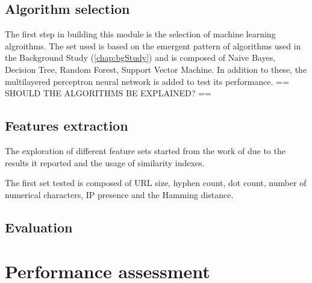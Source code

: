 \subsection{Algorithm selection}
The first step in building this module is the selection of machine learning algroithms. The set used is based on the emergent pattern of algorithms used in the Background Study (\ref{chap:bgStudy}) and is composed of Naive Bayes, Decision Tree, Random Forest, Support Vector Machine. In addition to these, the multilayered perceptron neural network is added to test its performance.
== SHOULD THE ALGORITHMS BE EXPLAINED? ==

\subsection{Features extraction}

The exploration of different feature sets started from the work of \cite{SVM_SIMILARITY_INDEX} due to the results it reported and the usage of similarity indexes.

The first set tested is composed of URL size, hyphen count, dot count, number of numerical characters, IP presence and the Hamming distance. 

\subsection{Evaluation}

\section{Performance assessment}

\iffalse
You should always start with an overview (Heading 2 style) to tell what this chapter is about and finish with a summary (Heading 2 style) to tell what has been covered in this chapter.

The Design and Implementation chapter should explain the design technique chosen and justify why it is appropriate, depending on the development methodology.  Suitable diagram-techniques (e.g. UML, other drawings) should be used where appropriate. For the Implementation part, it should talk about the technical realisation of the concepts and ideas developed earlier. It is used to describe the system at a finer level of technical details, down to the code level. However, do not attempt to describe all the code in the system, and do not include large pieces of code in this section. 

You should highlight the pieces of code which are critical to the system or worth to be noted. For example, the creation and/or implementation of core algorithms that make the system functional or some methods/ways you have used which are non-standard or innovative in the system implementation. You should also mention any unforeseen problems you encountered when implementing the system and how and to what extend you overcame them.

Appropriate testing must also be included in this section
\fi